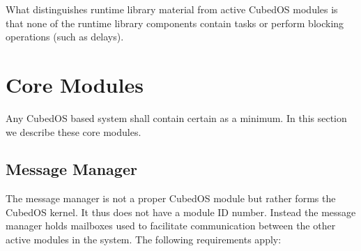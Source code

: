 What distinguishes runtime library material from active CubedOS modules is that none of the
runtime library components contain tasks or perform blocking operations (such as delays).

\section{Core Modules}
\label{sec:core-modules}

Any CubedOS based system shall contain certain  as a minimum. In this section we describe these core modules.

\subsection{Message Manager}
\label{sec:message-manager}

The message manager is not a proper CubedOS module but rather forms the CubedOS kernel. It thus
does not have a module ID number. Instead the message manager holds mailboxes used to facilitate
communication between the other active modules in the system. The following requirements apply:

